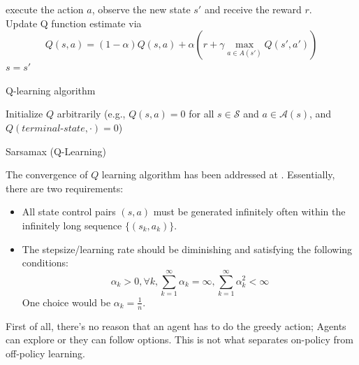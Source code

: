 \begin{refsection}
\begin{algorithm}[H]
{{			execute the action $a$, observe the new state $s'$ and receive the reward $r$.\\
			Update Q function estimate via
			$$Q(s,a) = (1-\alpha) Q(s,a) + \alpha(r + \gamma \max_{a\in A(s')} Q(s',a'))$$			
			$s = s'$
		}
	}
	\caption{Q-learning algorithm}
\end{algorithm}


\begin{algorithm}\label{ch:reinforcement-learning:alg:QLearningAlg}
	Initialize $Q$ arbitrarily (e.g., $Q(s,a) = 0$ for all $s\in\mathcal{S}$ and $a\in\mathcal{A}(s)$, and $Q(terminal\text{-}state, \cdot)=0$) \\
	\caption{Sarsamax (Q-Learning)}
\end{algorithm}

\begin{remark}
	The convergence of $Q$ learning algorithm has been addressed at \cite[495]{bertsekas2012dynamic2}. Essentially, there are two requirements:
	\begin{itemize}
		\item All state control pairs $(s,a)$ must be generated infinitely often within the infinitely long sequence $\{(s_k,a_k)\}$.
		\item The stepsize/learning rate should be diminishing and satisfying the following conditions:
		$$\alpha_k > 0, \forall k, \sum_{k=1}^\infty \alpha_k = \infty, \sum_{k=1}^\infty \alpha_k^2 < \infty$$
		One choice would be $\alpha_k = \frac{1}{n}$.
	\end{itemize}
\end{remark}

\begin{remark}
	First of all, there's no reason that an agent has to do the greedy action; Agents can explore or they can follow options. This is not what separates on-policy from off-policy learning.
	

\end{remark}
\end{refsection}
